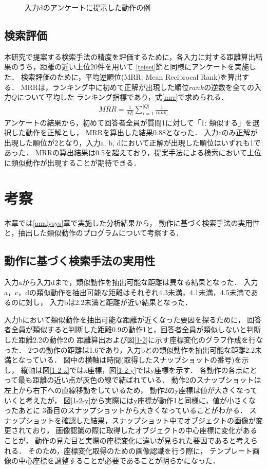 \documentclass[11pt]{jreport}
\begin{document}
\begin{figure}[H]
\begin{tabular}{cc}
      \end{tabular}
    \caption{入力dのアンケートに提示した動作の例}
    \label{inputd-ex}
\end{figure}

\section{検索評価} 
\label{ranking}     
本研究で提案する検索手法の精度を評価するために，各入力に対する距離算出結果のうち，距離の近い上位20件を用いて
\ref{teisei}節と同様にアンケートを実施した．
検索評価のために，平均逆順位(MRR: Mean Reciprocal Rank)を算出する．
MRRは，ランキング中に初めて正解が出現した順位$rank$の逆数を全ての入力$Q$について平均した
ランキング指標であり，式\ref{mrr}で求められる．
\begin{eqnarray}
    \label{mrr}
    MRR = \frac{1}{|Q|}\sum_{i=1}^{|Q|}\frac{1}{rank_i}
\end{eqnarray}
アンケートの結果から，初めて回答者全員が質問1に対して「1: 類似する」を選択した動作を正解とし，
MRRを算出した結果0.88となった．
入力cのみ正解が出現した順位が2となり，入力a, b, dにおいて正解が出現した順位はいずれも1であった．
MRRの算出結果は0.5を超えており，提案手法による検索において上位に類似動作が出現することが期待できる．

\chapter{考察}
本章では\ref{analysys}章で実施した分析結果から，
動作に基づく検索手法の実用性と，抽出した類似動作のプログラムについて考察する．

\section{動作に基づく検索手法の実用性}

入力aから入力dまで，類似動作を抽出可能な距離は異なる結果となった．
入力a，c，dの類似動作を抽出可能な距離はそれぞれ4.3未満，4.1未満，4.5未満であるのに対し，
入力bは2.2未満と距離が近い結果となった．

入力bにおいて類似動作を抽出可能な距離が近くなった要因を探るために，
回答者全員が類似すると判断した距離0.9の動作1と，回答者全員が類似しないと判断した距離2.2の動作2の
距離算出および図\ref{1-2}に示す座標変化のグラフ作成を行なった．
2つの動作の距離は1.6であり，入力bとの類似動作を抽出可能な距離2.2未満となっている．
図中の横軸は時間(取得したスナップショットの番号)を示し，
縦軸は図\ref{1-2-x}ではx座標，図\ref{1-2-y}ではy座標を示す．
各動作の各点にとって最も距離の近い点が灰色の線で結ばれている．
動作2のスナップショットは左上から右下への直線移動をしているため，
動作2のy座標は値が大きくなっていくと考えたが，
図\ref{1-2-y}から実際にはy座標が動作1と同様に，値が小さくなったあとに
3番目のスナップショットから大きくなっていることがわかる．
スナップショットを確認した結果，スナップショット中でオブジェクトの画像が変更されており，
画像認識の際に取得したオブジェクトの中心座標に変化があることが，
動作の見た目と実際の座標変化に違いが見られた要因であると考えられる．
そのため，座標変化取得のための画像認識を行う際に，
テンプレート画像の中心座標を調整することが必要であることが明らかになった．
\end{document}
